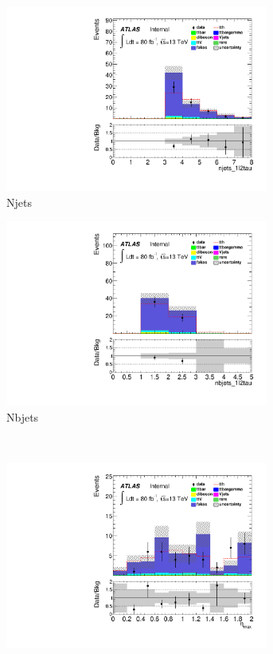 \begin{figure}[h]
\centering
\begin{subfigure}[b]{0.45\textwidth}
 \includegraphics[width=0.95\textwidth,angle=-90]{fig/lowBDTOSFakes/njets_1l2tau_F.pdf}
 \caption{Njets}
\end{subfigure}
\begin{subfigure}[b]{0.45\textwidth}
 \includegraphics[width=0.95\textwidth,angle=-90]{fig/lowBDTOSFakes/nbjets_1l2tau_F.pdf}
 \caption{Nbjets}
\end{subfigure}\\
\begin{subfigure}[b]{0.45\textwidth}
 \includegraphics[width=0.95\textwidth,angle=-90]{fig/lowBDTOSFakes/maxeta_F.pdf}

\end{subfigure}
\end{figure}
